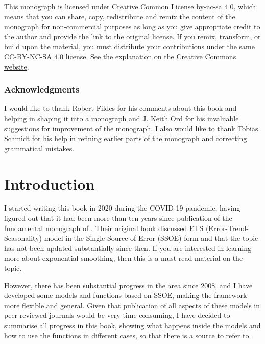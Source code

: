 \documentclass[
]{book}
\theoremstyle{definition}
\theoremstyle{definition}
\theoremstyle{definition}
\theoremstyle{definition}
\theoremstyle{remark}
\begin{document}
This monograph is licensed under \href{https://creativecommons.org/licenses/by-nc-sa/4.0/}{Creative Common License by-nc-sa 4.0}, which means that you can share, copy, redistribute and remix the content of the monograph for non-commercial purposes as long as you give appropriate credit to the author and provide the link to the original license. If you remix, transform, or build upon the material, you must distribute your contributions under the same CC-BY-NC-SA 4.0 license. See \href{https://creativecommons.org/licenses/by-nc-sa/4.0/}{the explanation on the Creative Commons website}.

\hypertarget{acknowledgments}{%
\subsection*{Acknowledgments}\label{acknowledgments}}

I would like to thank Robert Fildes for his comments about this book and helping in shaping it into a monograph and J. Keith Ord for his invaluable suggestions for improvement of the monograph. I also would like to thank Tobias Schmidt for his help in refining earlier parts of the monograph and correcting grammatical mistakes.

\hypertarget{intro}{%
\chapter{Introduction}\label{intro}}

I started writing this book in 2020 during the COVID-19 pandemic, having figured out that it had been more than ten years since publication of the fundamental monograph of \citet{Hyndman2008b}. Their original book discussed ETS (Error-Trend-Seasonality) model in the Single Source of Error (SSOE) form and that the topic has not been updated substantially since then. If you are interested in learning more about exponential smoothing, then this is a must-read material on the topic.

However, there has been substantial progress in the area since 2008, and I have developed some models and functions based on SSOE, making the framework more flexible and general. Given that publication of all aspects of these models in peer-reviewed journals would be very time consuming, I have decided to summarise all progress in this book, showing what happens inside the models and how to use the functions in different cases, so that there is a source to refer to.
\end{document}
